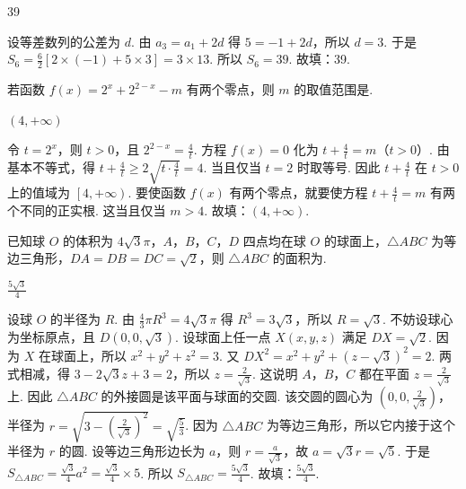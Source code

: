 \begin{answer}
39
\end{answer}

\begin{solution}
设等差数列的公差为 \(d\). 由 \(a_3=a_1+2d\) 得 \(5=-1+2d\)，所以 \(d=3\). 于是 \(S_6=\frac{6}{2}\left[ 2\times \left( -1 \right)+5\times 3 \right]=3\times 13\). 所以 \(S_6=39\).
故填：39.
\end{solution}

\begin{problem}
若函数 \(f\left( x \right)=2^x+2^{2-x}-m\) 有两个零点，则 \(m\) 的取值范围是\fillinblank{}.
\end{problem}

\begin{answer}
\(\left( 4,+\infty \right)\)
\end{answer}

\begin{solution}
令 \(t=2^x\)，则 \(t>0\)，且 \(2^{2-x}=\frac{4}{t}\). 方程 \(f(x)=0\) 化为 \(t+\frac{4}{t}=m\)（\(t>0\)）. 由基本不等式，得 \(t+\frac{4}{t}\ge 2\sqrt{t\cdot \frac{4}{t}}=4\). 当且仅当 \(t=2\) 时取等号. 因此 \(t+\frac{4}{t}\) 在 \(t>0\) 上的值域为 \(\left[ 4,+\infty \right)\).
要使函数 \(f(x)\) 有两个零点，就要使方程 \(t+\frac{4}{t}=m\) 有两个不同的正实根. 这当且仅当 \(m>4\). 故填：\(\left( 4,+\infty \right)\).
\end{solution}

\begin{problem}
已知球 \(O\) 的体积为 \(4\sqrt{3}\pi\)，\(A\)，\(B\)，\(C\)，\(D\) 四点均在球 \(O\) 的球面上，\(\triangle ABC\) 为等边三角形，\(DA=DB=DC=\sqrt{2}\)，则 \(\triangle ABC\) 的面积为\fillinblank{}.
\end{problem}

\begin{answer}
\(\frac{5\sqrt{3}}{4}\)
\end{answer}

\begin{solution}
设球 \(O\) 的半径为 \(R\). 由 \(\frac{4}{3}\pi R^3=4\sqrt{3}\pi\) 得 \(R^3=3\sqrt{3}\)，所以 \(R=\sqrt{3}\).
不妨设球心为坐标原点，且 \(D\left( 0,0,\sqrt{3} \right)\). 设球面上任一点 \(X(x,y,z)\) 满足 \(DX=\sqrt{2}\). 因为 \(X\) 在球面上，所以 \(x^2+y^2+z^2=3\). 又 \(DX^2=x^2+y^2+\left( z-\sqrt{3} \right)^2=2\). 两式相减，得 \(3-2\sqrt{3}z+3=2\)，所以 \(z=\frac{2}{\sqrt{3}}\). 这说明 \(A\)，\(B\)，\(C\) 都在平面 \(z=\frac{2}{\sqrt{3}}\) 上. 因此 \(\triangle ABC\) 的外接圆是该平面与球面的交圆.
该交圆的圆心为 \(\left( 0,0,\frac{2}{\sqrt{3}} \right)\)，半径为 \(r=\sqrt{3-\left( \frac{2}{\sqrt{3}} \right)^2}=\sqrt{\frac{5}{3}}\). 因为 \(\triangle ABC\) 为等边三角形，所以它内接于这个半径为 \(r\) 的圆. 设等边三角形边长为 \(a\)，则 \(r=\frac{a}{\sqrt{3}}\)，故 \(a=\sqrt{3}r=\sqrt{5}\). 于是 \(S_{\triangle ABC}=\frac{\sqrt{3}}{4}a^2=\frac{\sqrt{3}}{4}\times 5\). 所以 \(S_{\triangle ABC}=\frac{5\sqrt{3}}{4}\).
故填：\(\frac{5\sqrt{3}}{4}\).
\end{solution}
